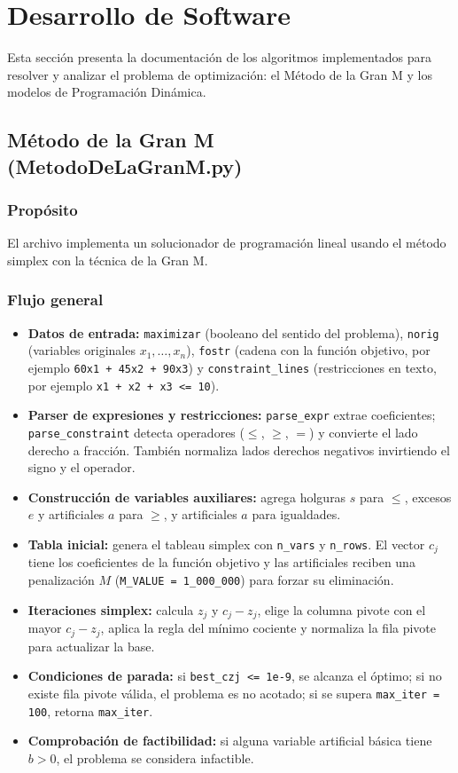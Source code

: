 \documentclass[12pt]{article}
\begin{document}
	\newpage
	
	\section{Desarrollo de Software}
	Esta sección presenta la documentación de los algoritmos implementados para resolver y analizar el problema de optimización: el Método de la Gran M y los modelos de Programación Dinámica.
	
	\subsection{Método de la Gran M (MetodoDeLaGranM.py)}
	
	\subsubsection{Propósito}
	El archivo implementa un solucionador de programación lineal usando el método simplex con la técnica de la Gran M.
	
	\subsubsection{Flujo general}
	\begin{itemize}
		\item \textbf{Datos de entrada:} \texttt{maximizar} (booleano del sentido del problema), \texttt{norig} (variables originales $x_1,\dots,x_n$), \texttt{fostr} (cadena con la función objetivo, por ejemplo \texttt{60x1 + 45x2 + 90x3}) y \texttt{constraint\_lines} (restricciones en texto, por ejemplo \texttt{x1 + x2 + x3 <= 10}).
		\item \textbf{Parser de expresiones y restricciones:} \texttt{parse\_expr} extrae coeficientes; \texttt{parse\_constraint} detecta operadores ($\le$, $\ge$, $=$) y convierte el lado derecho a fracción. También normaliza lados derechos negativos invirtiendo el signo y el operador.
		\item \textbf{Construcción de variables auxiliares:} agrega holguras $s$ para $\le$, excesos $e$ y artificiales $a$ para $\ge$, y artificiales $a$ para igualdades.
		\item \textbf{Tabla inicial:} genera el tableau simplex con \texttt{n\_vars} y \texttt{n\_rows}. El vector $c_j$ tiene los coeficientes de la función objetivo y las artificiales reciben una penalización $M$ (\texttt{M\_VALUE = 1\_000\_000}) para forzar su eliminación.
		\item \textbf{Iteraciones simplex:} calcula $z_j$ y $c_j - z_j$, elige la columna pivote con el mayor $c_j - z_j$, aplica la regla del mínimo cociente y normaliza la fila pivote para actualizar la base.
		\item \textbf{Condiciones de parada:} si \texttt{best\_czj <= 1e-9}, se alcanza el óptimo; si no existe fila pivote válida, el problema es no acotado; si se supera \texttt{max\_iter = 100}, retorna \texttt{max\_iter}.
		\item \textbf{Comprobación de factibilidad:} si alguna variable artificial básica tiene $b > 0$, el problema se considera infactible.
	\end{itemize}
	
\end{document}

